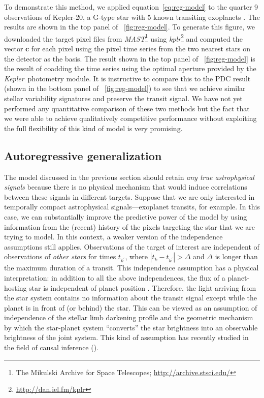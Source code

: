 \documentclass[letterpaper,12pt,whitepaper]{haastex}
\newcommand{\observatory}[1]{\textsl{#1}}
\newcommand{\Kepler}{\observatory{Kepler}}
\newcommand{\project}[1]{\textsl{#1}}
\newcommand{\MAST}{\project{MAST}}
\newcommand{\kplr}{\project{kplr}}
\begin{document}
To demonstrate this method, we applied equation~\ref{eq:reg-model} to the
quarter 9 observations of Kepler-20, a G-type star with 5 known transiting
exoplanets \citep{kepler20}.
The results are shown in the top panel of \figurename~\ref{fig:reg-model}.
To generate this figure, we downloaded the target pixel files from
\MAST\footnote{The Mikulski Archive for Space Telescopes;
\url{http://archive.stsci.edu/}} using
\kplr\footnote{\url{http://dan.iel.fm/kplr}}
and computed the vector $\mathbf{c}$ for each pixel using the pixel time
series from the two nearest stars on the detector as the basis.
The result shown in the top panel of \figurename~\ref{fig:reg-model} is the
result of coadding the time series using the optimal aperture provided by the
\Kepler\ photometry module.
It is instructive to compare this to the PDC result (shown in the bottom panel
of \figurename~\ref{fig:reg-model}) to see that we achieve similar stellar
variability signatures and preserve the transit signal.
We have not yet performed any quantitative comparison of these two methods but
the fact that we were able to achieve qualitatively competitive performance
without exploiting the full flexibility of this kind of model is very promising.

\subsection{Autoregressive generalization}
The model discussed in the previous section should retain \emph{any true
astrophysical signals} because there is no physical mechanism that would
induce correlations between these signals in different targets.
Suppose that we are only interested in temporally compact astrophysical
signals---exoplanet transits, for example.
In this case, we can substantially improve the predictive power of the model
by using information from the (recent) history of the pixels targeting the star
that we are trying to model.
In this context, a weaker version of the independence assumptions still
applies.
Observations of the target of interest are independent of observations of
\emph{other stars} for times $t_{k^\prime}$, where $|t_k - t_{k^\prime}| >
\Delta$ and $\Delta$ is longer than the maximum duration of a transit.
This independence assumption has a physical interpretation: in addition
to all the above independences, the flux of a planet-hosting star is
independent of planet position \citep[except in rare cases of close-in planets
that produce phase variations,][]{esteves2013}. Therefore, the light arriving
from the star system contains no information about the transit signal except
while the planet is in front of (or behind) the star.
This can be viewed as an assumption of independence of the stellar limb
darkening profile and the geometric mechanism by which the
star-planet system ``converts'' the star brightness into an observable
brightness of the joint system.
This kind of assumption has recently studied in the field of causal inference
(\citealt{JanSch10}).
\end{document}
